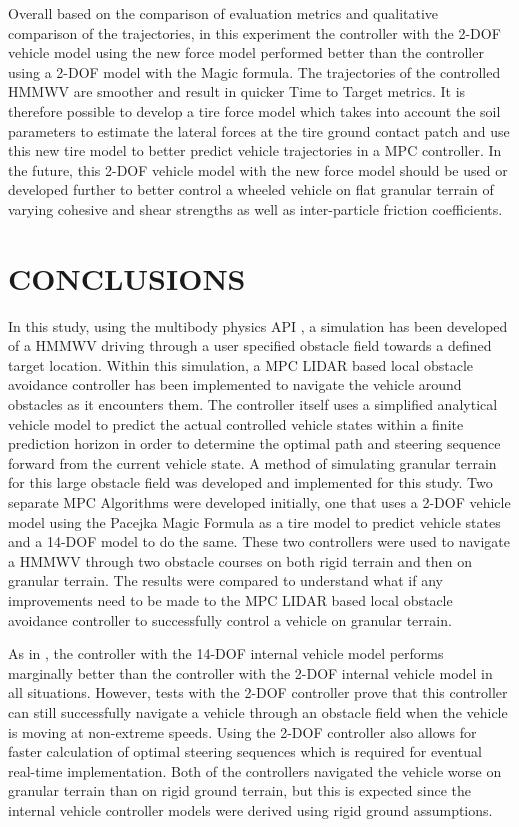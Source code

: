 \documentclass[12pt,onecolumn]{report}
\newcommand{\CHRONO}{{\sffamily{{Chrono}}}}
\begin{document}
Overall based on the comparison of evaluation metrics and qualitative comparison of the trajectories, in this experiment the controller with the 2-DOF vehicle model using the new force model performed better than the controller using a 2-DOF model with the Magic formula. The trajectories of the controlled HMMWV are smoother and result in quicker Time to Target metrics. It is therefore possible to develop a tire force model which takes into account the soil parameters to estimate the lateral forces at the tire ground contact patch and use this new tire model to better predict vehicle trajectories in a MPC controller. In the future, this 2-DOF vehicle model with the new force model should be used or developed further to better control a wheeled vehicle on flat granular terrain of varying cohesive and shear strengths as well as inter-particle friction coefficients. 


\chapter{CONCLUSIONS}\label{c:conclusion}

In this study, using the multibody physics API {\CHRONO}, a simulation has been developed of a HMMWV driving through a user specified obstacle field towards a defined target location. Within this simulation, a MPC LIDAR based local obstacle avoidance controller has been implemented to navigate the vehicle around obstacles as it encounters them. The controller itself uses a simplified analytical vehicle model to predict the actual controlled {\CHRONO} vehicle states within a finite prediction horizon in order to determine the optimal path and steering sequence forward from the current vehicle state. A method of simulating granular terrain for this large obstacle field was developed and implemented for this study. Two separate MPC Algorithms were developed initially, one that uses a 2-DOF vehicle model using the Pacejka Magic Formula as a tire model to predict {\CHRONO} vehicle states and a 14-DOF model to do the same. These two controllers were used to navigate a {\CHRONO} HMMWV through two obstacle courses on both rigid terrain and then on granular terrain. The results were compared to understand what if any improvements need to be made to the MPC LIDAR based local obstacle avoidance controller to successfully control a vehicle on granular terrain. 

As in \cite{ModelFidelity2016}, the controller with the 14-DOF internal vehicle model performs marginally better than the controller with the 2-DOF internal vehicle model in all situations. However, tests with the 2-DOF controller prove that this controller can still successfully navigate a vehicle through an obstacle field when the vehicle is moving at non-extreme speeds. Using the 2-DOF controller also allows for faster calculation of optimal steering sequences which is required for eventual real-time implementation. Both of the controllers navigated the vehicle worse on granular terrain than on rigid ground terrain, but this is expected since the internal vehicle controller models were derived using rigid ground assumptions. 
\end{document}
